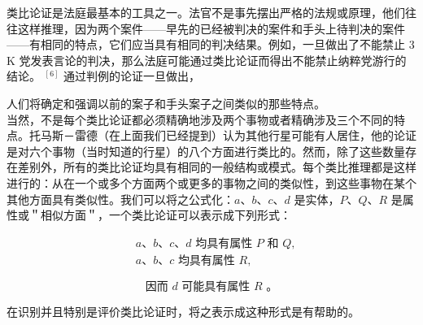 类比论证是法庭最基本的工具之一。法官不是事先摆出严格的法规或原理，他们往往这样推理，因为两个案件——早先的已经被判决的案件和手头上待判决的案件——有相同的特点，它们应当具有相同的判决结果。例如，一旦做出了不能禁止 3 K 党发表言论的判决，那么法庭可能通过类比论证而得出不能禁止纳粹党游行的结论。 ${ }^{[6]}$ 通过判例的论证一旦做出，

人们将确定和强调以前的案子和手头案子之间类似的那些特点。\\
当然，不是每个类比论证都必须精确地涉及两个事物或者精确涉及三个不同的特点。托马斯－雷德（在上面我们已经提到）认为其他行星可能有人居住，他的论证是对六个事物（当时知道的行星）的八个方面进行类比的。然而，除了这些数量存在差别外，所有的类比论证均具有相同的一般结构或模式。每个类比推理都是这样进行的：从在一个或多个方面两个或更多的事物之间的类似性，到这些事物在某个其他方面具有类似性。我们可以将之公式化：$a 、 b 、 c 、 d$ 是实体，$P 、 Q 、 R$ 是属性或＂相似方面＂，一个类比论证可以表示成下列形式：

$$
\begin{aligned}
& a 、 b 、 c 、 d \text { 均具有属性 } P \text { 和 } Q, \\
& a 、 b 、 c \text { 均具有属性 } R,
\end{aligned}
$$

$$
\text { 因而 } d \text { 可能具有属性 } R \text { 。 }
$$

在识别并且特别是评价类比论证时，将之表示成这种形式是有帮助的。

